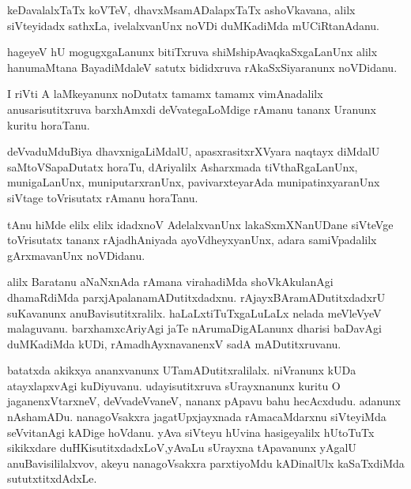 \documentclass{article}
\begin{document}
\begin{mn}%
keDavalalxTaTx koVTeV, dhavxMsamADalapxTaTx ashoVkavana, alilx siVteyidadx 
sathxLa, ivelalxvanUnx noVDi duMKadiMda mUCiRtanAdanu.
\end{mn}

\begin{mn}%
hageyeV hU mogugxgaLanunx bitiTxruva shiMshipAvaqkaSxgaLanUnx alilx hanumaMtana 
BayadiMdaleV satutx bididxruva rAkaSxSiyaranunx noVDidanu.
\end{mn}

\begin{mn}%
I riVti A laMkeyanunx noDutatx tamamx tamamx vimAnadalilx anusarisutitxruva 
barxhAmxdi deVvategaLoMdige rAmanu tananx Uranunx kuritu horaTanu.
\end{mn}

\begin{mn}%
deVvaduMduBiya dhavxnigaLiMdalU, apasxrasitxrXVyara naqtayx diMdalU 
saMtoVSapaDutatx horaTu, dAriyalilx Asharxmada tiVthaRgaLanUnx, munigaLanUnx, 
muniputarxranUnx, pavivarxteyarAda munipatinxyaranUnx siVtage toVrisutatx rAmanu 
horaTanu.
\end{mn}

\begin{mn}%
tAnu hiMde elilx elilx idadxnoV AdelalxvanUnx lakaSxmXNanUDane siVteVge 
toVrisutatx tananx rAjadhAniyada ayoVdheyxyanUnx, adara samiVpadalilx 
gArxmavanUnx noVDidanu.
\end{mn}

\begin{mn}%
alilx Baratanu aNaNxnAda rAmana virahadiMda shoVkAkulanAgi dhamaRdiMda 
parxjApalanamADutitxdadxnu. rAjayxBAramADutitxdadxrU suKavanunx 
anuBavisutitxralilx. haLaLxtiTuTxgaLuLaLx nelada meVleVyeV malaguvanu. 
barxhamxcAriyAgi jaTe nArumaDigALanunx dharisi baDavAgi duMKadiMda kUDi, 
rAmadhAyxnavanenxV sadA mADutitxruvanu.
\end{mn}

\begin{mn}%
batatxda akikxya ananxvanunx UTamADutitxralilalx. niVranunx kUDa atayxlapxvAgi 
kuDiyuvanu. udayisutitxruva sUrayxnanunx kuritu O jaganenxVtarxneV, deVvadeVvaneV, 
nananx pApavu bahu hecAcxdudu. adanunx nAshamADu. nanagoVsakxra jagatUpxjayxnada 
rAmacaMdarxnu siVteyiMda seVvitanAgi kADige hoVdanu. yAva siVteyu hUvina 
hasigeyalilx hUtoTuTx sikikxdare duHKisutitxdadxLoV,yAvaLu sUrayxna tApavanunx 
yAgalU anuBavisililalxvov, akeyu nanagoVsakxra parxtiyoMdu kADinalUlx 
kaSaTxdiMda sututxtitxdAdxLe.
\end{mn}
\end{document}
